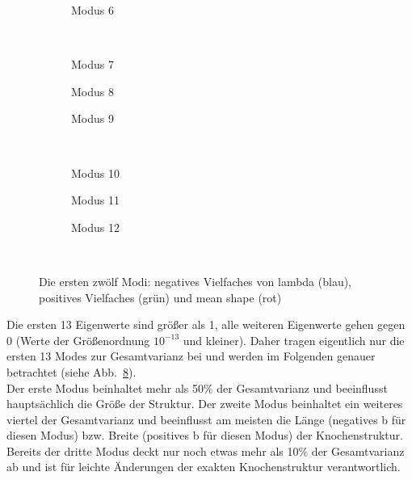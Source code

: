 \documentclass[]{report}
\begin{document}
\begin{enumerate}
\begin{enumerate}
\begin{figure}[tbp!]
\begin{subfigure}{0.3\textwidth}
					\caption{Modus 6}
					\label{fig:mode6}
				\end{subfigure}	
				\\
				\begin{subfigure}{0.3\textwidth}
					\centering
					
					\caption{Modus 7}
					\label{fig:mode7}
				\end{subfigure}
				\quad
				\begin{subfigure}{0.3\textwidth}
					\centering
					
					\caption{Modus 8}
					\label{fig:mode8}
				\end{subfigure}	
				\quad
				\begin{subfigure}{0.3\textwidth}
					\centering
					
					\caption{Modus 9}
					\label{fig:mode9}
				\end{subfigure}	
				\\
				\begin{subfigure}{0.3\textwidth}
					\centering
					
					\caption{Modus 10}
					\label{fig:mode10}
				\end{subfigure}
				\quad
				\begin{subfigure}{0.3\textwidth}
					\centering
					
					\caption{Modus 11}
					\label{fig:mode11}
				\end{subfigure}	
				\quad
				\begin{subfigure}{0.3\textwidth}
					\centering
					
					\caption{Modus 12}
					\label{fig:mode12}
				\end{subfigure}	
				\\
				\caption{Die ersten zwölf Modi: negatives Vielfaches von lambda (blau), positives Vielfaches (grün) und mean shape (rot)}
				\label{fig:modi}
			\end{figure}
			Die ersten 13 Eigenwerte sind größer als 1, alle weiteren Eigenwerte gehen gegen 0 (Werte der Größenordnung $10^{-13}$ und kleiner). Daher tragen eigentlich nur die ersten 13 Modes zur Gesamtvarianz bei und werden im Folgenden genauer betrachtet (siehe Abb.~\ref{fig:modi}).\\
			Der erste Modus beinhaltet mehr als 50\% der Gesamtvarianz und beeinflusst hauptsächlich die Größe der Struktur.
			Der zweite Modus beinhaltet ein weiteres viertel der Gesamtvarianz und beeinflusst am meisten die Länge (negatives b für diesen Modus) bzw. Breite (positives b für diesen Modus) der Knochenstruktur.
			Bereits der dritte Modus deckt nur noch etwas mehr als 10\% der Gesamtvarianz ab und ist für leichte Änderungen der exakten Knochenstruktur verantwortlich.

\end{enumerate}
\end{enumerate}
\end{document}
